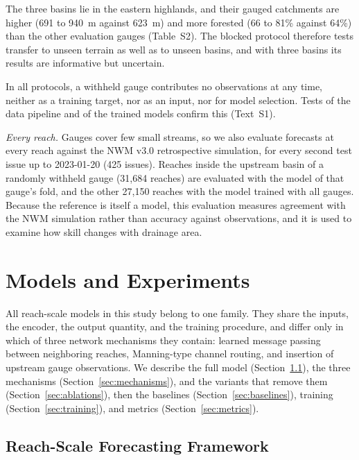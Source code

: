 \documentclass[draft]{agujournal2019}
\begin{document}
The three basins lie in the eastern highlands, and their gauged catchments are higher (691 to 940~m against 623~m) and more forested (66 to 81\% against 64\%) than the other evaluation gauges (Table~S2). The blocked protocol therefore tests transfer to unseen terrain as well as to unseen basins, and with three basins its results are informative but uncertain.

In all protocols, a withheld gauge contributes no observations at any time, neither as a training target, nor as an input, nor for model selection. Tests of the data pipeline and of the trained models confirm this (Text~S1).

\textit{Every reach.} Gauges cover few small streams, so we also evaluate forecasts at every reach against the NWM v3.0 retrospective simulation, for every second test issue up to 2023-01-20 (425 issues). Reaches inside the upstream basin of a randomly withheld gauge (31,684 reaches) are evaluated with the model of that gauge's fold, and the other 27,150 reaches with the model trained with all gauges. Because the reference is itself a model, this evaluation measures agreement with the NWM simulation rather than accuracy against observations, and it is used to examine how skill changes with drainage area.


\section{Models and Experiments}
\label{sec:methods}

All reach-scale models in this study belong to one family. They share the inputs, the encoder, the output quantity, and the training procedure, and differ only in which of three network mechanisms they contain: learned message passing between neighboring reaches, Manning-type channel routing, and insertion of upstream gauge observations. We describe the full model (Section~\ref{sec:framework}), the three mechanisms (Section~\ref{sec:mechanisms}), and the variants that remove them (Section~\ref{sec:ablations}), then the baselines (Section~\ref{sec:baselines}), training (Section~\ref{sec:training}), and metrics (Section~\ref{sec:metrics}).

\subsection{Reach-Scale Forecasting Framework}
\label{sec:framework}
\end{document}
